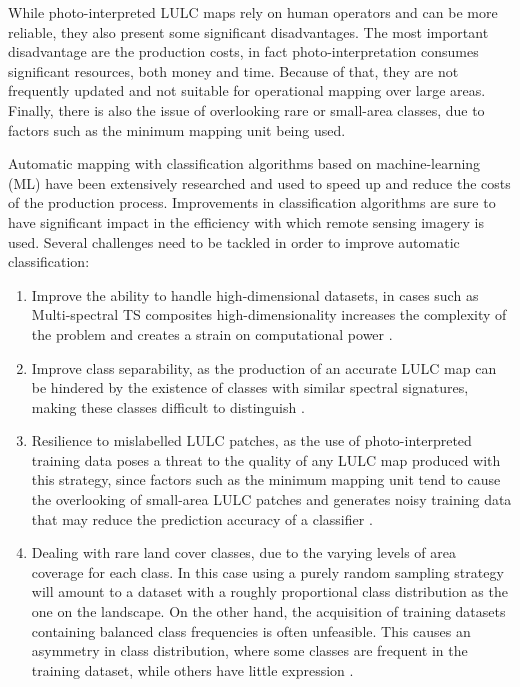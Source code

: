 \documentclass[parskip=full]{scrartcl}
\begin{document}
While photo-interpreted LULC maps rely on human operators and can be more
reliable, they also present some significant disadvantages. The most important
disadvantage are the production costs, in fact photo-interpretation consumes
significant resources, both money and time. Because of that, they are not
frequently updated and not suitable for operational mapping over large areas.
Finally, there is also the issue of overlooking rare or small-area classes, due
to factors such as the minimum mapping unit being used.

Automatic mapping with classification algorithms based on machine-learning (ML)
have been extensively researched and used to speed up and reduce the costs of
the production process. Improvements in classification algorithms are sure to
have significant impact in the efficiency with which remote sensing imagery is
used. Several challenges need to be tackled in order to improve automatic
classification:

\begin{enumerate}
    \item Improve the ability to handle high-dimensional datasets, in cases such
        as Multi-spectral TS composites high-dimensionality increases the
        complexity of the problem and creates a strain on computational power
        \cite{Stromann2020}.
    \item Improve class separability, as the production of an accurate LULC map
        can be hindered by the existence of classes with similar spectral
        signatures, making these classes difficult to distinguish
        \cite{Alonso-Sarria2019}.
    \item Resilience to mislabelled LULC patches, as the use of
        photo-interpreted training data poses a threat to the quality of any
        LULC map produced with this strategy, since factors such as the minimum
        mapping unit tend to cause the overlooking of small-area LULC patches
        and generates noisy training data that may reduce the prediction
        accuracy of a classifier \cite{Pelletier2017}.
    \item Dealing with rare land cover classes, due to the varying levels of
        area coverage for each class. In this case using a purely random
        sampling strategy will amount to a dataset with a roughly proportional
        class distribution as the one on the landscape. On the other hand, the
        acquisition of training datasets containing balanced class frequencies
        is often unfeasible. This causes an asymmetry in class distribution,
        where some classes are frequent in the training dataset, while others
        have little expression \cite{Wang2019, Feng2019}.
\end{enumerate}
\end{document}
